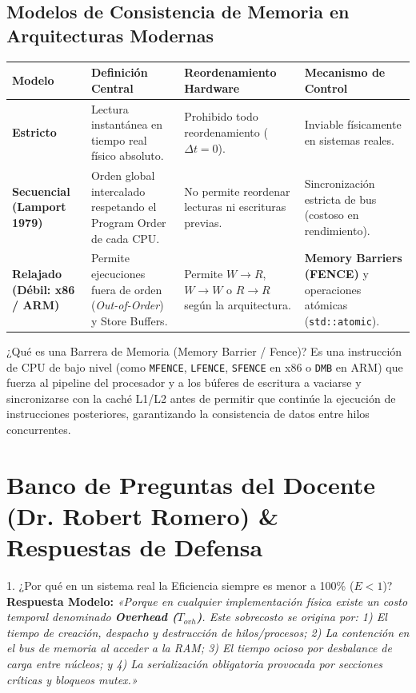 \documentclass[11pt,a4paper]{article}
\begin{document}
\subsection{Modelos de Consistencia de Memoria en Arquitecturas Modernas}

\begin{table}[h!]
\centering
\small
\begin{tabular}{@{}lp{4.2cm}p{4.2cm}p{4.2cm}@{}}
\toprule
\textbf{Modelo} & \textbf{Definición Central} & \textbf{Reordenamiento Hardware} & \textbf{Mecanismo de Control} \\ \midrule
\textbf{Estricto} & Lectura instantánea en tiempo real físico absoluto. & Prohibido todo reordenamiento ($\Delta t = 0$). & Inviable físicamente en sistemas reales. \\
\textbf{Secuencial (Lamport 1979)} & Orden global intercalado respetando el Program Order de cada CPU. & No permite reordenar lecturas ni escrituras previas. & Sincronización estricta de bus (costoso en rendimiento). \\
\textbf{Relajado (Débil: x86 / ARM)} & Permite ejecuciones fuera de orden (\textit{Out-of-Order}) y Store Buffers. & Permite $W \to R$, $W \to W$ o $R \to R$ según la arquitectura. & \textbf{Memory Barriers (FENCE)} y operaciones atómicas (\texttt{std::atomic}). \\ \bottomrule
\end{tabular}
\end{table}

\begin{conceptbox}{¿Qué es una Barrera de Memoria (Memory Barrier / Fence)?}
Es una instrucción de CPU de bajo nivel (como \texttt{MFENCE}, \texttt{LFENCE}, \texttt{SFENCE} en x86 o \texttt{DMB} en ARM) que fuerza al pipeline del procesador y a los búferes de escritura a vaciarse y sincronizarse con la caché L1/L2 antes de permitir que continúe la ejecución de instrucciones posteriores, garantizando la consistencia de datos entre hilos concurrentes.
\end{conceptbox}

\section{Banco de Preguntas del Docente (Dr. Robert Romero) \& Respuestas de Defensa}

\begin{qabox}{1. ¿Por qué en un sistema real la Eficiencia siempre es menor a 100\% ($E < 1$)?}
\textbf{Respuesta Modelo:}  
\textit{«Porque en cualquier implementación física existe un costo temporal denominado \textbf{Overhead ($T_{ovh}$)}. Este sobrecosto se origina por: 1) El tiempo de creación, despacho y destrucción de hilos/procesos; 2) La contención en el bus de memoria al acceder a la RAM; 3) El tiempo ocioso por desbalance de carga entre núcleos; y 4) La serialización obligatoria provocada por secciones críticas y bloqueos mutex.»}
\end{qabox}
\end{document}
